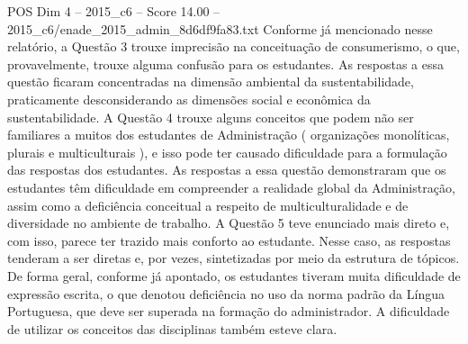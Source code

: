 \begin{textsample}{POS Dim 4 – 2015\_c6 – Score 14.00 – 2015\_c6/enade\_2015\_admin\_8d6df9fa83.txt}
Conforme já mencionado nesse relatório, a Questão 3 trouxe imprecisão na conceituação de consumerismo, o que, provavelmente, trouxe alguma confusão para os estudantes.
As respostas a essa questão ficaram concentradas na dimensão ambiental da sustentabilidade, praticamente desconsiderando as dimensões social e econômica da sustentabilidade.
A Questão 4 trouxe alguns conceitos que podem não ser familiares a muitos dos estudantes de Administração ( organizações monolíticas, plurais e multiculturais ), e isso pode ter causado dificuldade para a formulação das respostas dos estudantes.
As respostas a essa questão demonstraram que os estudantes têm dificuldade em compreender a realidade global da Administração, assim como a deficiência conceitual a respeito de multiculturalidade e de diversidade no ambiente de trabalho.
A Questão 5 teve enunciado mais direto e, com isso, parece ter trazido mais conforto ao estudante.
Nesse caso, as respostas tenderam a ser diretas e, por vezes, sintetizadas por meio da estrutura de tópicos.
De forma geral, conforme já apontado, os estudantes tiveram muita dificuldade de expressão escrita, o que denotou deficiência no uso da norma padrão da Língua Portuguesa, que deve ser superada na formação do administrador.
A dificuldade de utilizar os conceitos das disciplinas também esteve clara.

\end{textsample}
